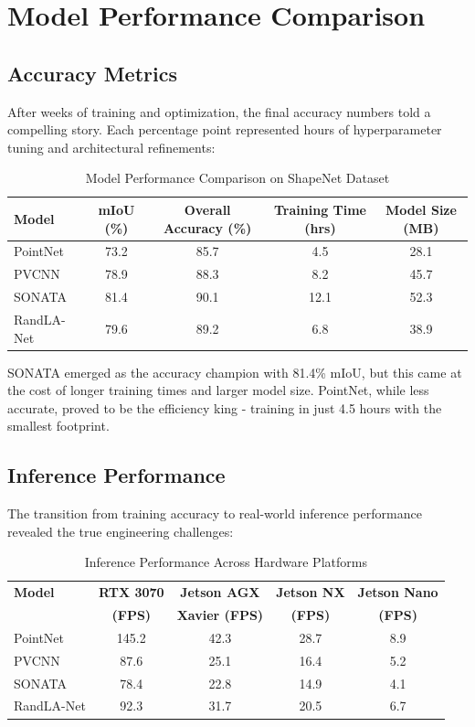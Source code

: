 \documentclass[12pt,a4paper]{report}
\begin{document}
\section{Model Performance Comparison}

\subsection{Accuracy Metrics}

After weeks of training and optimization, the final accuracy numbers told a compelling story. Each percentage point represented hours of hyperparameter tuning and architectural refinements:

\begin{table}[htbp]
\centering
\caption{Model Performance Comparison on ShapeNet Dataset}
\label{tab:shapenet_performance}
\begin{tabular}{@{}lcccc@{}}
\toprule
Model & mIoU (\%) & Overall Accuracy (\%) & Training Time (hrs) & Model Size (MB) \\
\midrule
PointNet & 73.2 & 85.7 & 4.5 & 28.1 \\
PVCNN & 78.9 & 88.3 & 8.2 & 45.7 \\
SONATA & 81.4 & 90.1 & 12.1 & 52.3 \\
RandLA-Net & 79.6 & 89.2 & 6.8 & 38.9 \\
\bottomrule
\end{tabular}
\end{table}

SONATA emerged as the accuracy champion with 81.4\% mIoU, but this came at the cost of longer training times and larger model size. PointNet, while less accurate, proved to be the efficiency king - training in just 4.5 hours with the smallest footprint.

\subsection{Inference Performance}

The transition from training accuracy to real-world inference performance revealed the true engineering challenges:

\begin{table}[htbp]
\centering
\caption{Inference Performance Across Hardware Platforms}
\label{tab:hardware_performance}
\begin{tabular}{@{}lcccc@{}}
\toprule
\textbf{Model} & \textbf{RTX 3070} & \textbf{Jetson AGX} & \textbf{Jetson NX} & \textbf{Jetson Nano} \\
& \textbf{(FPS)} & \textbf{Xavier (FPS)} & \textbf{(FPS)} & \textbf{(FPS)} \\
\midrule
PointNet & 145.2 & 42.3 & 28.7 & 8.9 \\
PVCNN & 87.6 & 25.1 & 16.4 & 5.2 \\
SONATA & 78.4 & 22.8 & 14.9 & 4.1 \\
RandLA-Net & 92.3 & 31.7 & 20.5 & 6.7 \\
\bottomrule
\end{tabular}
\end{table}
\end{document}
